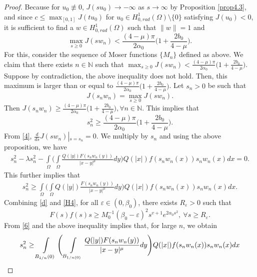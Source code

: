 \documentclass[11pt]{amsart}
\numberwithin{equation}{section}
\newcommand{\hr}{H^1_{0, rad}(\Omega)}
\newcommand{\1}{\frac{1}{2}}
\begin{document}
	\begin{proof}
		Because for $u_0\not \equiv0$, $J(su_0)\to -\infty$ as $s \to \infty$ by Proposition \ref{prop4.3}, and since $c \leq \displaystyle \max_{[0,1]} J(tu_0)$ for $u_0\in \hr \setminus \{0\}$ satisfying $J(u_0) < 0$, it is sufficient to find a $w\in \hr$ such that $\|w\|=1$ and
		\[\max_{s\geq 0} J(sw_n)< \frac{(4-\mu)\pi}{2\alpha_0}\Big( 1+ \frac{2b_0}{4-\mu}\Big).
		\] 
		For this, consider the sequence of Moser functions $\{M_n\}$ defined as above. We claim that there exists $n\in \mathbb{N}$ such that $\displaystyle\max_{s\geq 0} J(sw_n)< \frac{(4-\mu)\pi}{2\alpha_0}\Big( 1+ \frac{2b_0}{4-\mu}\Big)$. Suppose by contradiction, the above inequality does not hold. Then, this maximum is larger than or equal to $\frac{(4-\mu)\pi}{2\alpha_0}\Big( 1+ \frac{2b_0}{4-\mu}\Big)$. Let $s_n >0$ be such that 
		\begin{equation}
			\label{4}
			J(s_nw_n) = \max_{s \geq 0} J(sw_n).
		\end{equation}
		Then $J(s_nw_n) \geq \frac{(4-\mu)\pi}{2\alpha_0}\Big( 1+ \frac{2b_0}{4-\mu}\Big), \forall n \in \mathbb{N}.$ This implies that
		\begin{equation}
			\label{5}
			s_n^2 \geq \frac{(4-\mu)\pi}{2\alpha_0}\Big( 1+ \frac{2b_0}{4-\mu}\Big).
		\end{equation}
		From \eqref{4}, $\frac{d}{ds}J(sw_n)\left|_{s=s_n}=0 \right.$. We multiply by $s_n$ and using the above proposition, we have
		\begin{align}
			s_n^2 -\lambda s_n^2 - \int\limits_\Omega \Bigg( \int\limits_\Omega \frac{Q(|y|)F(s_nw_n(y))}{|x-y|^\mu}dy \Bigg) Q(|x|)f(s_nw_n(x))s_n w_n(x)dx =0. \nonumber
		\end{align} 
		This further implies that 
		\begin{align}
			s_n^2 \geq \int\limits_\Omega \Bigg( \int\limits_\Omega Q(|y|)\frac{F(s_nw_n(y))}{|x-y|^\mu}dy \Bigg) Q(|x|)f(s_nw_n(x))s_n w_n(x)dx. \label{6}
		\end{align}
		Combining \eqref{d} and \eqref{H4}, for all $\varepsilon \in (0, \beta_0)$, there exists $R_\varepsilon>0$ such that
		\[ F(s)f(s)s \geq M_0^{-1} (\beta_0-\varepsilon)^2 s^{v+1}e^{2\alpha_0 s^2}, \ \forall s \geq R_\varepsilon.\] 
		From \eqref{6} and the above inequality implies that, for large $n$, we obtain
		\begin{align}
			s_n^2 &\geq \int\limits\limits_{B_{1/n}(0)} \Bigg( \int\limits\limits_{B_{1/n(0)}} \frac{Q(|y|)F(s_nw_n(y))}{|x-y|^\mu}dy \Bigg) Q(|x|)f(s_nw_n(x))s_n w_n(x)dx\nonumber\\

\end{align}
\end{proof}
\end{document}
